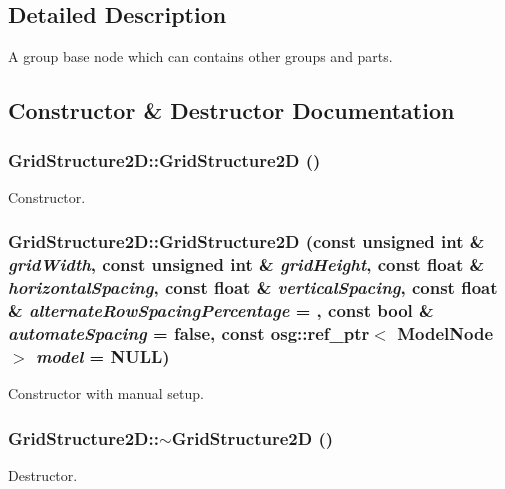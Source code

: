 \subsection{Detailed Description}
A group base node which can contains other groups and parts. 

\subsection{Constructor \& Destructor Documentation}
\hypertarget{class_grid_structure2_d_ad7665e25b03615d26437a6d2d7a6ab13}{
\subsubsection[{GridStructure2D}]{\setlength{\rightskip}{0pt plus 5cm}GridStructure2D::GridStructure2D ()}}
\label{class_grid_structure2_d_ad7665e25b03615d26437a6d2d7a6ab13}
Constructor. \hypertarget{class_grid_structure2_d_a6e85d262f6e5c6a8be7aad82e4c0eb8b}{
\subsubsection[{GridStructure2D}]{\setlength{\rightskip}{0pt plus 5cm}GridStructure2D::GridStructure2D (const unsigned int \& {\em gridWidth}, \/  const unsigned int \& {\em gridHeight}, \/  const float \& {\em horizontalSpacing}, \/  const float \& {\em verticalSpacing}, \/  const float \& {\em alternateRowSpacingPercentage} = {}, \/  const bool \& {\em automateSpacing} = {\ttfamily false}, \/  const osg::ref\_\-ptr$<$ ModelNode $>$ {\em model} = {\ttfamily NULL})}}
\label{class_grid_structure2_d_a6e85d262f6e5c6a8be7aad82e4c0eb8b}
Constructor with manual setup. \hypertarget{class_grid_structure2_d_a90ac22e05a7e1bf2737d3fa51d158b61}{
\subsubsection[{$\sim$GridStructure2D}]{\setlength{\rightskip}{0pt plus 5cm}GridStructure2D::$\sim$GridStructure2D ()}}
\label{class_grid_structure2_d_a90ac22e05a7e1bf2737d3fa51d158b61}
Destructor. 

